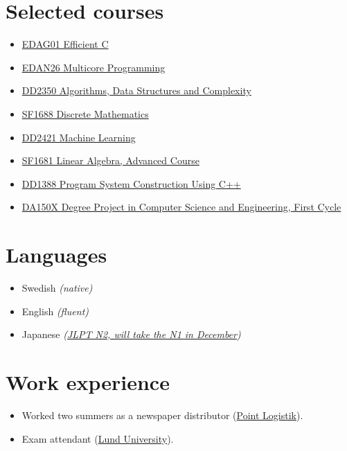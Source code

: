 \documentclass[11pt]{article}
\begin{document}
\section{Selected courses}
\vspace*{-14pt}
\begin{multicols}{2}
\begin{itemize}
    \item \href{https://kurser.lth.se/lot/course-syllabus-en/23_24/EDAG01}{EDAG01 Efficient C}
    \item \href{https://kurser.lth.se/lot/course-syllabus-en/24_25/EDAN26}{EDAN26 Multicore Programming}
    \item \href{https://www.kth.se/student/kurser/kurs/DD2350?l=en}{DD2350 Algorithms, Data Structures and Complexity}
    \item \href{https://www.kth.se/student/kurser/kurs/SF1688?l=en}{SF1688 Discrete Mathematics}
    \item \href{https://www.kth.se/student/kurser/kurs/DD2421?l=en}{DD2421 Machine Learning}
    \item \href{https://www.kth.se/student/kurser/kurs/SF1681?l=en}{SF1681 Linear Algebra, Advanced Course}
    \item \href{https://www.kth.se/student/kurser/kurs/DD1388?l=en}{DD1388 Program System Construction Using C++}
    \item \href{https://www.kth.se/student/kurser/kurs/DA150X?l=en}{DA150X Degree Project in Computer Science and Engineering, First Cycle}
\end{itemize}
\end{multicols}

\section{Languages}
\begin{itemize}
    \item Swedish \textit{(native)}
    \item English \textit{(fluent)}
    \item Japanese \textit{(\href{https://www.jlpt.jp/e/about/levelsummary.html}{JLPT N2, will take the N1 in December})}
\end{itemize}

\section{Work experience}
\begin{itemize}
    \item Worked two summers as a newspaper distributor (\href{https://www.pointlogistik.se/}{Point Logistik}).
    \item Exam attendant (\href{https://www.lth.se/english/}{Lund University}).
\end{itemize}
\end{document}
